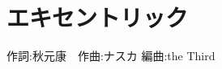 \section{エキセントリック}

\begin{center}
    \scriptsize{
        作詞:秋元康　作曲:ナスカ	編曲:the Third
    }
\end{center}

\vspace{0.7em}

\begin{Parallel}[c]{0.47\textwidth}{0.47\textwidth}

\ParallelLText{
    \footnotesize{
        
    }
}

\ParallelRText{
    \footnotesize{
       
    }
}

\end{Parallel}
